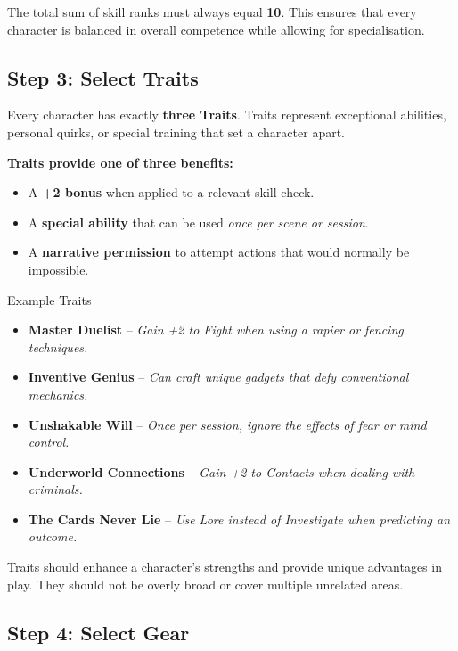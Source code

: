 The total sum of skill ranks must always equal \textbf{10}. This ensures that every character is balanced in overall competence while allowing for specialisation.

\subsection{Step 3: Select Traits}

Every character has exactly \textbf{three Traits}. Traits represent exceptional abilities, personal quirks, or special training that set a character apart. 

\textbf{Traits provide one of three benefits:}
\begin{itemize}
    \item A \textbf{+2 bonus} when applied to a relevant skill check.
    \item A \textbf{special ability} that can be used \emph{once per scene or session}.
    \item A \textbf{narrative permission} to attempt actions that would normally be impossible.
\end{itemize}

\begin{DndSidebar}[float=!b]{Example Traits}
    \begin{itemize}
        \item \textbf{Master Duelist} – \emph{Gain +2 to Fight when using a rapier or fencing techniques.}
        \item \textbf{Inventive Genius} – \emph{Can craft unique gadgets that defy conventional mechanics.}
        \item \textbf{Unshakable Will} – \emph{Once per session, ignore the effects of fear or mind control.}
        \item \textbf{Underworld Connections} – \emph{Gain +2 to Contacts when dealing with criminals.}
        \item \textbf{The Cards Never Lie} – \emph{Use Lore instead of Investigate when predicting an outcome.}
    \end{itemize}
\end{DndSidebar}

Traits should enhance a character’s strengths and provide unique advantages in play. They should not be overly broad or cover multiple unrelated areas.

\subsection{Step 4: Select Gear}

